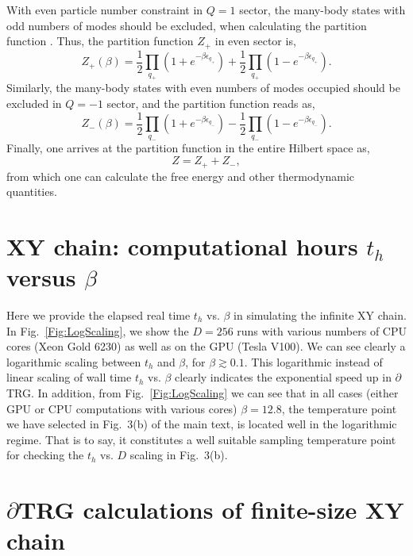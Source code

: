 \documentclass[aps,prx,twocolumn,showpacs,psfig,superscriptaddress,longbibliography]{revtex4-1}
\def\dTRG{$\partial$TRG\xspace}
\begin{document}
{With even particle number constraint in $Q=1$ sector, the many-body states with odd numbers of modes should be excluded, when calculating the partition function \cite{Chen-CFT2017,Tu-CFT2017}. Thus, the partition function $Z_+$ in even sector is, 
\begin{equation}
Z_+(\beta) = \frac{1}{2}\prod_{q_+} (1+e^{-\beta\epsilon_{q_+}}) + \frac{1}{2}\prod_{q_+} (1-e^{-\beta\epsilon_{q_+}}).
\end{equation}
Similarly, the many-body states with even numbers of modes occupied should be excluded in $Q=-1$ sector, and the partition function reads as,
\begin{equation}
Z_-(\beta) = \frac{1}{2}\prod_{q_-} (1+e^{-\beta\epsilon_{q_-}}) - \frac{1}{2}\prod_{q_-} (1-e^{-\beta\epsilon_{q_-}}).
\end{equation}
Finally, one arrives at the partition function in the entire Hilbert space as, 
\begin{equation}
Z = Z_+ + Z_-,
\end{equation}
from which one can calculate the free energy and other thermodynamic quantities.
}

\section{XY chain: computational hours $t_h$ versus $\beta$}
\label{App:thscaling}
Here we provide the elapsed real time $t_h$ vs. $\beta$ in simulating the infinite XY chain. 
In Fig.~\ref{Fig:LogScaling}, we show the $D=256$ runs with various numbers of CPU cores (Xeon Gold 6230) 
as well as on the GPU (Tesla V100). We can see clearly a logarithmic scaling between
$t_h$ and $\beta$, for $\beta \gtrsim 0.1$. This logarithmic instead of linear scaling of wall time $t_h$ 
vs. $\beta$ clearly indicates the exponential speed up in \dTRG. In addition, from Fig.~\ref{Fig:LogScaling} we can see that in all cases 
(either GPU or CPU computations with various cores) $\beta=12.8$, 
the temperature point we have selected in Fig.~{\color{blue}3}(b) of the main text, 
is located well in the logarithmic regime.
That is to say, it constitutes a well suitable sampling temperature point 
for checking the $t_h$ vs. $D$ scaling in Fig.~{\color{blue}3}(b).


\section{$\partial$TRG calculations of finite-size XY chain}
\label{App:FXYC}
\end{document}
